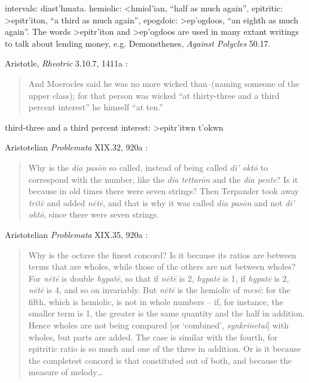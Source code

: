\documentclass{amsart}
\newcommand{\textgreek}[1]{\begingroup\fontencoding{LGR}\selectfont#1\endgroup}
\theoremstyle{definition}
\begin{document}
intervals: \textgreek{diast'hmata}.
hemiolic: \textgreek{<hmiol'ian}, ``half as much again'',
epitritic: \textgreek{>epitr'iton}, ``a third as much again'',
epogdoic: \textgreek{>ep'ogdoos}, ``an eighth as much again''. The words \textgreek{>epitr'iton} and
\textgreek{>ep'ogdoos} are used in many extant writings to talk about lending money, e.g. Demonsthenes, {\em Against Polycles} 50.17.

Aristotle, {\em Rheotric} 3.10.7, 1411a \cite[p.~220]{rhetoric}:

\begin{quote}
And Moerocles said he was no more
wicked than--(naming someone of the upper class); for that person
was wicked ``at thirty-three and a third percent interest'' he himself
``at ten.''
\end{quote}

third-three and a third percent interest: \textgreek{>epitr'itwn t'okwn}

Aristotelian {\em Problemata} XIX.32, 920a \cite[pp.~198]{GMWI}:

\begin{quote}
Why is the {\em dia pas\={o}n} so called, instead of being called {\em di' okt\={o}} to correspond
with the number, like the {\em dia tettar\={o}n} and the {\em dia pente}? Is it because in old
times there were seven strings? Then Terpander took away {\em trit\={e}} and added
{\em n\={e}t\={e}}, and that is why it was called {\em dia pas\={o}n} and not {\em di' okt\={o}}, since there
were seven strings.
\end{quote}

Aristotelian {\em Problemata} XIX.35, 920a \cite[pp.~93]{barker}:

\begin{quote}
Why is the octave the finest concord? Is it because its ratios are
between terms that are wholes, while those of the others are not between
wholes? For {\em n\={e}t\={e}} is double {\em hypat\={e}}, so that if {\em n\={e}t\={e}} is 2, {\em hypat\={e}}
is 1, if {\em hypat\={e}} is
2, {\em n\={e}t\={e}} is 4, and so on invariably. But {\em n\={e}t\={e}} is the hemiolic of {\em mes\={e}}:
for the fifth, which is hemiolic, is not in whole numbers -- if, for instance, the smaller term
is 1, the greater is the same quantity and the half in addition. Hence wholes are
not being compared [or `combined', {\em synkrinetai}] with wholes, but parts are
added. The case is similar with the fourth, for epitritic ratio is so much and one
of the three in addition. Or is it because the completest concord is that
constituted out of both, and because the measure of melody\dots
\end{quote}
\end{document}
